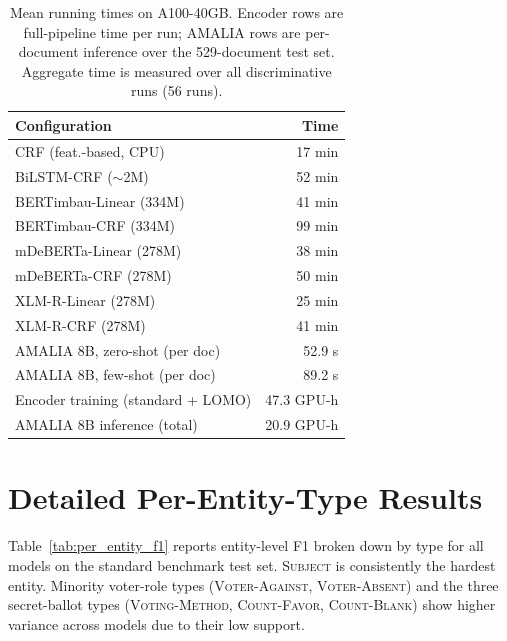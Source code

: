 \documentclass[11pt]{article}
\begin{document}
\begin{table}[ht!]
\centering
\small
\setlength{\tabcolsep}{6pt}
\caption{Mean running times on A100-40GB. Encoder rows are full-pipeline time per run; AMALIA rows are per-document inference over the 529-document test set. Aggregate time is measured over all discriminative runs (56 runs).}
\label{tab:runtimes}
\begin{tabular}{@{}lr@{}}
\toprule
\textbf{Configuration} & \textbf{Time} \\
\midrule
CRF (feat.-based, CPU)           & 17 min \\
BiLSTM-CRF ($\sim$2M)            & 52 min \\
BERTimbau-Linear (334M)          & 41 min \\
BERTimbau-CRF (334M)             & 99 min \\
mDeBERTa-Linear (278M)           & 38 min \\
mDeBERTa-CRF (278M)              & 50 min \\
XLM-R-Linear (278M)              & 25 min \\
XLM-R-CRF (278M)                 & 41 min \\
\midrule
AMALIA 8B, zero-shot (per doc)   & 52.9 s \\
AMALIA 8B, few-shot (per doc)    & 89.2 s \\
\midrule
Encoder training (standard + LOMO) & 47.3 GPU-h \\
AMALIA 8B inference (total)         & 20.9 GPU-h \\
\bottomrule
\end{tabular}
\end{table}

\FloatBarrier


\section{Detailed Per-Entity-Type Results}
\label{appendix:per-entity}

Table~\ref{tab:per_entity_f1} reports entity-level F1 broken down by type for all models on the standard benchmark test set. \textsc{Subject} is consistently the hardest entity. Minority voter-role types (\textsc{Voter-Against}, \textsc{Voter-Absent}) and the three secret-ballot types (\textsc{Voting-Method}, \textsc{Count-Favor}, \textsc{Count-Blank}) show higher variance across models due to their low support.
\end{document}
